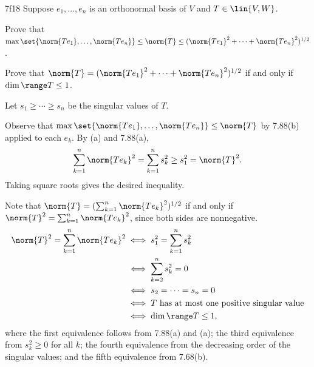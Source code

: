 \begin{exercise}{7f18}
    Suppose $e_1, \ldots, e_n$ is an orthonormal basis of $V$ and $T \in \lin{V, W}$.
    \begin{subexercises}
        \item Prove that $\max\set{\norm{Te_1}, \ldots, \norm{Te_n}} \leq \norm{T} \leq (\norm{Te_1}^2 + \cdots + \norm{Te_n}^2)^{1/2}$.
        \item Prove that $\norm{T} = (\norm{Te_1}^2 + \cdots + \norm{Te_n}^2)^{1/2}$ if and only if $\dim \range T \leq 1$.
    \end{subexercises}

\end{exercise}

\begin{sol}
    Let $s_1 \geq \cdots \geq s_n$ be the singular values of $T$.
    \begin{subexercises}
        \item Observe that $\max\set{\norm{Te_1}, \ldots, \norm{Te_n}} \leq \norm{T}$ by 7.88(b) applied to each $e_k$.
        By (a) and 7.88(a),
        \[
            \sum_{k=1}^n \norm{Te_k}^2 = \sum_{k=1}^n s_k^2 \geq s_1^2 = \norm{T}^2.
        \]
        Taking square roots gives the desired inequality.
        \item
        Note that $\norm{T} = (\sum_{k=1}^n \norm{T e_k}^2)^{1/2}$ if and only if $\norm{T}^2 = \sum_{k=1}^n \norm{T e_k}^2$, since both sides are nonnegative.
        \begin{align*}
            \norm{T}^2 = \sum_{k=1}^n \norm{T e_k}^2 &\iff s_1^2 = \sum_{k=1}^n s_k^2 \\
            &\iff \sum_{k=2}^n s_k^2 = 0 \\
            &\iff s_2 = \cdots = s_n = 0 \\
            &\iff T \text{ has at most one positive singular value} \\
            &\iff \dim \range T \leq 1,
        \end{align*}
        where the first equivalence follows from 7.88(a) and (a); the third equivalence from $s_k^2 \geq 0$ for all $k$; the fourth equivalence from the decreasing order of the singular values; and the fifth equivalence from 7.68(b). \qedhere
    \end{subexercises}
\end{sol}

